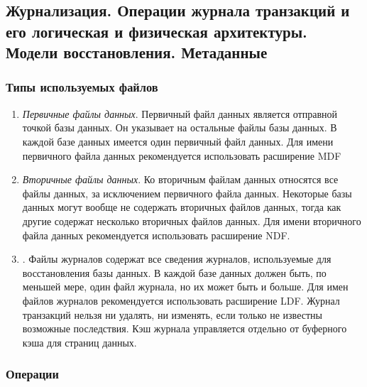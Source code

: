 \newpage

\subsection{Журнализация. Операции журнала транзакций и его логическая и физическая архитектуры. Модели восстановления. Метаданные}

\subsubsection{Типы используемых файлов}

\begin{enumerate}
	\item \textit{Первичные файлы данных}. Первичный файл данных является отправной точкой базы данных. Он указывает на 
	остальные файлы базы данных. В каждой базе данных имеется один первичный файл данных. Для имени первичного 
	файла данных рекомендуется использовать расширение MDF
	\item \textit{Вторичные файлы данных}. Ко вторичным файлам данных относятся все файлы данных, за исключением первичного 
	файла данных. Некоторые базы данных могут вообще не содержать вторичных файлов данных, тогда как другие 
	содержат несколько вторичных файлов данных. Для имени вторичного файла данных рекомендуется использовать 
	расширение NDF.
	\item {}. Файлы журналов содержат все сведения журналов, используемые для восстановления базы 
	данных. В каждой базе данных должен быть, по меньшей мере, один файл журнала, но их может быть и больше. Для 
	имен файлов журналов рекомендуется использовать расширение LDF. Журнал транзакций нельзя ни удалять, ни 
	изменять, если только не известны возможные последствия. Кэш журнала управляется отдельно от буферного кэша 
	для страниц данных.
\end{enumerate}

\subsubsection{Операции}


